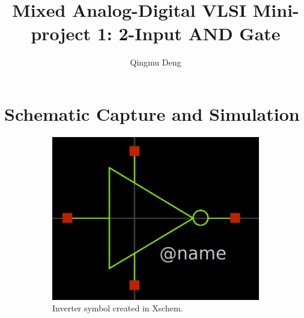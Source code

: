 \documentclass[11pt]{article}
\begin{document}
\title{Mixed Analog-Digital VLSI Mini-project 1: 2-Input AND Gate}
\author{Qingmu Deng}
\maketitle %


\section{Schematic Capture and Simulation}
    \begin{figure}[!ht]
        \begin{subfigure}{0.5\linewidth}
            \includegraphics[width=\linewidth]{inverter_sym.png}
            \caption{Inverter symbol created in Xschem.}
        \end{subfigure}
        \begin{subfigure}{0.5\linewidth}

\end{subfigure}
\end{figure}
\end{document}
